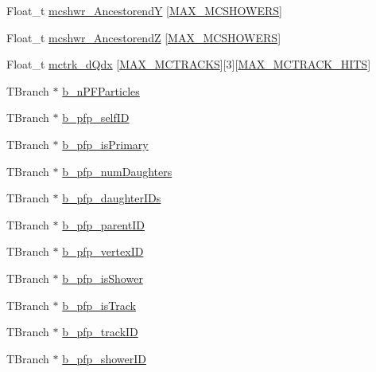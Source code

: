 \begin{DoxyCompactItemize}
\item 
Float\-\_\-t \hyperlink{classanatree_a1fc8a0f84f6c07882df62ff65d0985ca}{mcshwr\-\_\-\-Ancestorend\-Y} \mbox{[}\hyperlink{anatree__core__v09410002_8h_ac14fc9ac3bf074dc1c2ab53cbd26449b}{M\-A\-X\-\_\-\-M\-C\-S\-H\-O\-W\-E\-R\-S}\mbox{]}
\item 
Float\-\_\-t \hyperlink{classanatree_a0835b0181ad1de6885422192ce8dfe2f}{mcshwr\-\_\-\-Ancestorend\-Z} \mbox{[}\hyperlink{anatree__core__v09410002_8h_ac14fc9ac3bf074dc1c2ab53cbd26449b}{M\-A\-X\-\_\-\-M\-C\-S\-H\-O\-W\-E\-R\-S}\mbox{]}
\item 
Float\-\_\-t \hyperlink{classanatree_a484fc4042c03dcc31a2e44e29c12aac3}{mctrk\-\_\-d\-Qdx} \mbox{[}\hyperlink{anatree__core__v09410002_8h_a98f5edaba00d7f5e3185331916d9cc58}{M\-A\-X\-\_\-\-M\-C\-T\-R\-A\-C\-K\-S}\mbox{]}\mbox{[}3\mbox{]}\mbox{[}\hyperlink{anatree__core__v09410002_8h_a67830c53f9fcaa2d8a2fd72f26a69921}{M\-A\-X\-\_\-\-M\-C\-T\-R\-A\-C\-K\-\_\-\-H\-I\-T\-S}\mbox{]}
\item 
T\-Branch $\ast$ \hyperlink{classanatree_a076fa2e9cde062e7e17eb5f581ac5cd3}{b\-\_\-n\-P\-F\-Particles}
\item 
T\-Branch $\ast$ \hyperlink{classanatree_ae9425db3876cb2e3a31cc309d51a6d18}{b\-\_\-pfp\-\_\-self\-I\-D}
\item 
T\-Branch $\ast$ \hyperlink{classanatree_aca2cc95738f07a0d84826c0b5bf9a157}{b\-\_\-pfp\-\_\-is\-Primary}
\item 
T\-Branch $\ast$ \hyperlink{classanatree_a7fcebaf222e83de0d99adfdc7f9fa26f}{b\-\_\-pfp\-\_\-num\-Daughters}
\item 
T\-Branch $\ast$ \hyperlink{classanatree_a099f2a6b079ed7ae439e5e7b70891d17}{b\-\_\-pfp\-\_\-daughter\-I\-Ds}
\item 
T\-Branch $\ast$ \hyperlink{classanatree_a7e044f6c5590fa78b2b1823e115f5cdf}{b\-\_\-pfp\-\_\-parent\-I\-D}
\item 
T\-Branch $\ast$ \hyperlink{classanatree_a858642ddaf2fec248175666bcd2426bf}{b\-\_\-pfp\-\_\-vertex\-I\-D}
\item 
T\-Branch $\ast$ \hyperlink{classanatree_a3ab0dea70b4f53a8b032b88fdaf370af}{b\-\_\-pfp\-\_\-is\-Shower}
\item 
T\-Branch $\ast$ \hyperlink{classanatree_a099a4bb742834bff882a66f9a202492b}{b\-\_\-pfp\-\_\-is\-Track}
\item 
T\-Branch $\ast$ \hyperlink{classanatree_a4c1146f762bca5b7a8582d694ea707d5}{b\-\_\-pfp\-\_\-track\-I\-D}
\item 
T\-Branch $\ast$ \hyperlink{classanatree_a391ae38fcda06b0ecda453169da666d8}{b\-\_\-pfp\-\_\-shower\-I\-D}

\end{DoxyCompactItemize}
